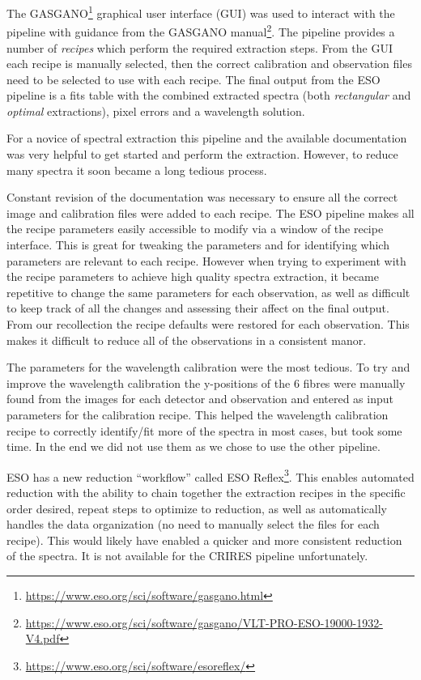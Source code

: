 The GASGANO\footnote{\href{https://www.eso.org/sci/software/gasgano.html}{https://www.eso.org/sci/software/gasgano.html}} graphical user interface (GUI) was used to interact with the pipeline with guidance from the GASGANO manual\footnote{\href{https://www.eso.org/sci/software/gasgano/VLT-PRO-ESO-19000-1932-V4.pdf}{https://www.eso.org/sci/software/gasgano/VLT-PRO-ESO-19000-1932-V4.pdf}}. The pipeline provides a number of \emph{recipes} which perform the required extraction steps. From the GUI each recipe is manually selected, then the correct calibration and observation files need to be selected to use with each recipe.  The final output from the ESO pipeline is a fits table with the combined extracted spectra (both \emph{rectangular} and \emph{optimal} extractions), pixel errors and a wavelength solution.

For a novice of spectral extraction this pipeline and the available documentation was very helpful to get started and perform the extraction. However, to reduce many spectra it soon became a long tedious process.

Constant revision of the documentation was necessary to ensure all the correct image and calibration files were added to each recipe. The ESO pipeline makes all the recipe parameters easily accessible to modify via a window of the recipe interface. This is great for tweaking the parameters and for identifying which parameters are relevant to each recipe. However when trying to experiment with the recipe parameters to achieve high quality spectra extraction, it became repetitive to change the same parameters for each observation, as well as difficult to keep track of all the changes and assessing their affect on the final output. From our recollection the recipe defaults were restored for each observation. This makes it difficult to reduce all of the observations in a consistent manor.

The parameters for the wavelength calibration were the most tedious. To try and improve the wavelength calibration the {y-positions} of the 6 \thar{} fibres were manually found from the images for each detector and observation and entered as input parameters for the calibration recipe. This helped the wavelength calibration recipe to correctly identify/fit more of the \thar{} spectra in most cases, but took some time. In the end we did not use them as we chose to use the other pipeline.

ESO has a new reduction ``workflow'' called ESO Reflex\citep{freudling_automated_2013}\footnote{\href{https://www.eso.org/sci/software/esoreflex/}{https://www.eso.org/sci/software/esoreflex/}}. This enables automated reduction with the ability to chain together the extraction recipes in the specific order desired, repeat steps to optimize to reduction, as well as automatically handles the data organization (no need to manually select the files for each recipe). This would likely have enabled a quicker and more consistent reduction of the spectra. It is not available for the CRIRES pipeline unfortunately.

